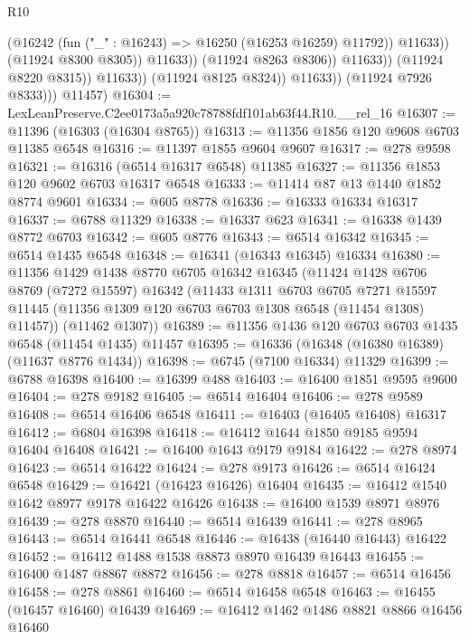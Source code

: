 \begin{lexlean}{R10}
\begin{coremodule}
                                      (@16242 (fun ("_" : @16243) => @16250 (@16253 @16259) @11792))
                                      @11633))
                                  (@11924 @8300 @8305))
                                @11633))
                            (@11924 @8263 @8306))
                          @11633))
                      (@11924 @8220 @8315))
                    @11633))
                (@11924 @8125 @8324))
              @11633))
          (@11924 @7926 @8333)))
      @11457)
@16304 := LexLeanPreserve.C2ee0173a5a920c78788fdf101ab63f44.R10.__rel_16
@16307 := @11396 (@16303 (@16304 @8765))
@16313 := @11356 @1856 @120 @9608 @6703 @11385 @6548
@16316 := @11397 @1855 @9604 @9607
@16317 := @278 @9598
@16321 := @16316 (@6514 @16317 @6548) @11385
@16327 := @11356 @1853 @120 @9602 @6703 @16317 @6548
@16333 := @11414 @87 @13 @1440 @1852 @8774 @9601
@16334 := @605 @8778
@16336 := @16333 @16334 @16317
@16337 := @6788 @11329
@16338 := @16337 @623
@16341 := @16338 @1439 @8772 @6703
@16342 := @605 @8776
@16343 := @6514 @16342
@16345 := @6514 @1435 @6548
@16348 := @16341 (@16343 @16345) @16334
@16380 := @11356
    @1429
    @1438
    @8770
    @6705
    @16342
    @16345
    (@11424
      @1428
      @6706
      @8769
      (@7272 @15597)
      @16342
      (@11433
        @1311
        @6703
        @6705
        @7271
        @15597
        @11445
        (@11356 @1309 @120 @6703 @6703 @1308 @6548 (@11454 @1308) @11457))
      (@11462 @1307))
@16389 := @11356 @1436 @120 @6703 @6703 @1435 @6548 (@11454 @1435) @11457
@16395 := @16336 (@16348 (@16380 @16389) (@11637 @8776 @1434))
@16398 := @6745 (@7100 @16334) @11329
@16399 := @6788 @16398
@16400 := @16399 @488
@16403 := @16400 @1851 @9595 @9600
@16404 := @278 @9182
@16405 := @6514 @16404
@16406 := @278 @9589
@16408 := @6514 @16406 @6548
@16411 := @16403 (@16405 @16408) @16317
@16412 := @6804 @16398
@16418 := @16412 @1644 @1850 @9185 @9594 @16404 @16408
@16421 := @16400 @1643 @9179 @9184
@16422 := @278 @8974
@16423 := @6514 @16422
@16424 := @278 @9173
@16426 := @6514 @16424 @6548
@16429 := @16421 (@16423 @16426) @16404
@16435 := @16412 @1540 @1642 @8977 @9178 @16422 @16426
@16438 := @16400 @1539 @8971 @8976
@16439 := @278 @8870
@16440 := @6514 @16439
@16441 := @278 @8965
@16443 := @6514 @16441 @6548
@16446 := @16438 (@16440 @16443) @16422
@16452 := @16412 @1488 @1538 @8873 @8970 @16439 @16443
@16455 := @16400 @1487 @8867 @8872
@16456 := @278 @8818
@16457 := @6514 @16456
@16458 := @278 @8861
@16460 := @6514 @16458 @6548
@16463 := @16455 (@16457 @16460) @16439
@16469 := @16412 @1462 @1486 @8821 @8866 @16456 @16460

\end{coremodule}
\end{lexlean}
